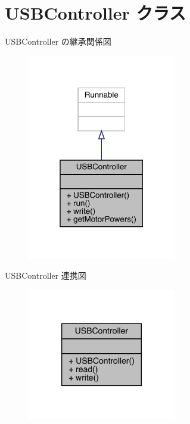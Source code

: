 \hypertarget{class_u_s_b_controller}{}\section{U\+S\+B\+Controller クラス}
\label{class_u_s_b_controller}


U\+S\+B\+Controller の継承関係図
\nopagebreak
\begin{figure}[H]
\begin{center}
\leavevmode
\includegraphics[width=184pt]{de/d83/class_u_s_b_controller__inherit__graph}
\end{center}
\end{figure}


U\+S\+B\+Controller 連携図
\nopagebreak
\begin{figure}[H]
\begin{center}
\leavevmode
\includegraphics[width=184pt]{d2/d26/class_u_s_b_controller__coll__graph}
\end{center}
\end{figure}
